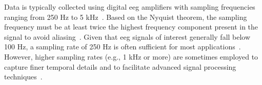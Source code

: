 Data is typically collected using digital \gls{eeg} amplifiers with sampling frequencies ranging from 250 Hz to 5 kHz~\cite{veniero-2009}.
Based on the Nyquist theorem, the sampling frequency must be at least twice the highest frequency component present in the signal to
avoid aliasing~\cite{leis-2011}. Given that \gls{eeg} signals of interest generally fall below 100 Hz, a sampling rate of 250 Hz is often sufficient for most applications~\cite{Naydenov2022}. However, higher sampling rates (e.g., 1 kHz or more) are sometimes employed to capture finer temporal details and to facilitate advanced signal processing techniques~\cite{LEAHY1998159}.
